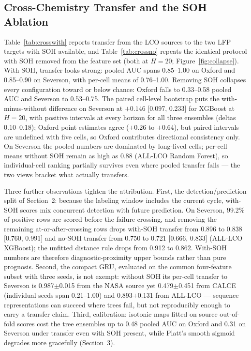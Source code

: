 \documentclass[11pt,a4paper]{article}
\begin{document}
\subsection{Cross-Chemistry Transfer and the SOH Ablation}
Table~\ref{tab:crosswith} reports transfer from the LCO sources to the two LFP targets with SOH available, and Table~\ref{tab:crossno} repeats the identical protocol with SOH removed from the feature set (both at $H{=}20$; Figure~\ref{fig:collapse}). With SOH, transfer looks strong: pooled AUC spans 0.85--1.00 on Oxford and 0.85--0.90 on Severson, with per-cell means of 0.76--1.00. Removing SOH collapses every configuration toward or below chance: Oxford falls to 0.33--0.58 pooled AUC and Severson to 0.53--0.75. The paired cell-level bootstrap puts the with-minus-without difference on Severson at $+0.146$ [0.097, 0.233] for XGBoost at $H{=}20$, with positive intervals at every horizon for all three ensembles (deltas 0.10--0.18); Oxford point estimates agree ($+0.26$ to $+0.64$), but paired intervals are undefined with five cells, so Oxford contributes directional consistency only. On Severson the pooled numbers are dominated by long-lived cells; per-cell means without SOH remain as high as 0.88 (ALL-LCO Random Forest), so individual-cell ranking partially survives even where pooled transfer fails --- the two views bracket what actually transfers.

Three further observations tighten the attribution. First, the detection/prediction split of Section~2: because the labeling window includes the current cycle, with-SOH scores mix concurrent detection with future prediction. On Severson, 99.2\% of positive rows are scored before the failure crossing, and removing the remaining at-or-after-crossing rows drops with-SOH transfer from 0.896 to 0.838 [0.760, 0.991] and no-SOH transfer from 0.750 to 0.721 [0.666, 0.833] (ALL-LCO XGBoost); the unfitted distance rule drops from 0.912 to 0.862. With-SOH numbers are therefore diagnostic-proximity upper bounds rather than pure prognosis. Second, the compact GRU, evaluated on the common four-feature subset with three seeds, is not exempt: without SOH its per-cell transfer to Severson is 0.987$\pm$0.015 from the NASA source yet 0.479$\pm$0.451 from CALCE (individual seeds span 0.21--1.00) and 0.893$\pm$0.131 from ALL-LCO --- sequence representations can succeed where trees fail, but not reproducibly enough to carry a transfer claim. Third, calibration: isotonic maps fitted on source out-of-fold scores cost the tree ensembles up to 0.48 pooled AUC on Oxford and 0.31 on Severson under transfer even with SOH present, while Platt's smooth sigmoid degrades more gracefully (Section~3).
\end{document}
